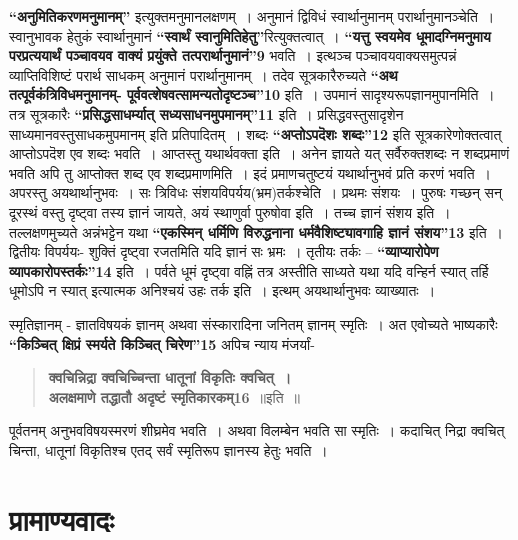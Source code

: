 {\textbf{“अनुमितिकरणमनुमानम्”} इत्युक्तमनुमानलक्षणम्~। अनुमानं द्विविधं स्वार्थानुमानम् परार्थानुमानञ्चेति~। स्वानुभावक हेतुकं स्वार्थानुमानं \textbf{“स्वार्थं स्वानुमितिहेतु”}रित्युक्तत्वात्~। \textbf{“यत्तु स्वयमेव धूमादग्निमनुमाय परप्रत्ययार्थं पञ्चावयव वाक्यं प्रयुंक्ते तत्परार्थानुमानं”9} भवति~। इत्थञ्च पञ्चावयवाक्यसमुत्पन्नं व्याप्तिविशिष्टं परार्थ साधकम् अनुमानं परार्थानुमानम्~। तदेव सूत्रकारैरुच्यते \textbf{“अथ तत्पूर्वकंत्रिविधमनुमानम्- पूर्ववत्शेषवत्सामन्यतोदृष्टञ्च”10} इति~। उपमानं सादृश्यरूपज्ञानमुपानमिति~। तत्र सूत्रकारैः \textbf{“प्रसिद्धसाधर्म्यात् सध्यसाधनमुपमानम्”11} इति~। प्रसिद्धवस्तुसादृशेन साध्यमानवस्तुसाधकमुपमानम् इति प्रतिपादितम्~। शब्दः \textbf{“अप्तोऽपदॆशः शब्दः”12} इति सूत्रकारेणोक्तत्वात् आप्तोऽपदॆश एव शब्दः भवति~। आप्तस्तु यथार्थवक्ता इति~। अनेन ज्ञायते यत् सर्वैरुक्तशब्दः न शब्दप्रमाणं भवति अपि तु आप्तोक्त शब्द एव शब्दप्रमाणमिति~। इदं प्रमाणचतुष्टयं यथार्थानुभवं प्रति करणं भवति~। अपरस्तु अयथार्थानुभवः~। सः त्रिविधः संशयविपर्यय(भ्रम)तर्कश्चेति~। प्रथमः संशयः~। पुरुषः गच्छन् सन् दूरस्थं वस्तु दृष्ट्वा तस्य ज्ञानं जायते, अयं स्थाणुर्वा पुरुषोवा इति~। तच्च ज्ञानं संशय इति~। तल्लक्षणमुच्यते अन्नंभट्टेन यथा \textbf{“एकस्मिन् धर्मिणि विरुद्धनाना धर्मवैशिष्ट्यावगाहि ज्ञानं संशय”13} इति~। द्वितीयः विपर्ययः- शुक्तिं दृष्ट्वा रजतमिति यदि ज्ञानं सः भ्रमः~। तृतीयः तर्कः – \textbf{“व्याप्यारोपेण व्यापकारोपस्तर्कः”14} इति~। पर्वते धूमं दृष्ट्वा वह्निं तत्र अस्तीति साध्यते यथा यदि वन्हिर्न स्यात् तर्हि धूमोऽपि न स्यात् इत्यात्मक अनिश्चयं उहः तर्क इति~। इत्थम् अयथार्थानुभवः व्याख्यातः~। 

स्मृतिज्ञानम् - ज्ञातविषयकं ज्ञानम् अथवा संस्कारादिना जनितम् ज्ञानम् स्मृतिः~। अत एवोच्यते भाष्यकारैः \textbf{“किञ्चित् क्षिप्रं स्मर्यते किञ्चित् चिरेण”15} अपिच न्याय मंजर्यां-
\begin{verse}
\textbf{क्वचिन्निद्रा क्वचिच्चिन्ता धातूनां विकृतिः क्वचित्~। \\
अलक्षमाणे तद्धातौ अदृष्टं स्मृतिकारकम्16}~॥इति~॥
\end{verse}
पूर्वतनम् अनुभवविषयस्मरणं शीघ्रमेव भवति~। अथवा विलम्बेन भवति सा स्मृतिः~। कदाचित् निद्रा क्वचित् चिन्ता, धातूनां विकृतिश्च एतद् सर्वं स्मृतिरूप ज्ञानस्य हेतुः भवति~। 

\section*{प्रामाण्यवादः}

}
